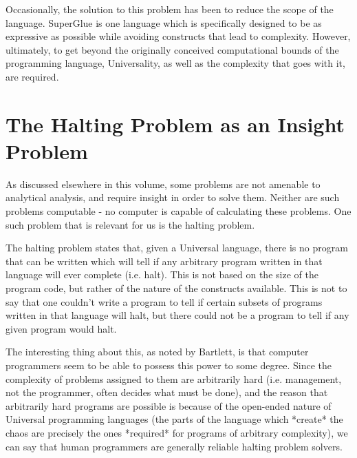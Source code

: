 Occasionally, the solution to this problem has been to reduce the scope of the language.  SuperGlue is one language which is specifically designed to be as expressive as possible while avoiding constructs that lead to complexity.\cite{mcdirmid}  However, ultimately, to get beyond the originally conceived computational bounds of the programming language, Universality, as well as the complexity that goes with it, are required.

\section{The Halting Problem as an Insight Problem}

As discussed elsewhere in this volume, some problems are not amenable to analytical analysis, and require insight in order to solve them.\cite{bartlett1}\cite{holloway}  Neither are such problems computable - no computer is capable of calculating these problems.  One such problem that is relevant for us is the halting problem.

The halting problem states that, given a Universal language, there is no program that can be written which will tell if any arbitrary program written in that language will ever complete (i.e. halt).  This is not based on the size of the program code, but rather of the nature of the constructs available.  This is not to say that one couldn't write a program to tell if certain subsets of programs written in that language will halt, but there could not be a program to tell if any given program would halt.

The interesting thing about this, as noted by Bartlett\cite{bartlett1}, is that computer programmers seem to be able to possess this power to some degree.  Since the complexity of problems assigned to them are arbitrarily hard (i.e. management, not the programmer, often decides what must be done), and the reason that arbitrarily hard programs are possible is because of the open-ended nature of Universal programming languages (the parts of the language which *create* the chaos are precisely the ones *required* for programs of arbitrary complexity), we can say that human programmers are generally reliable halting problem solvers.

